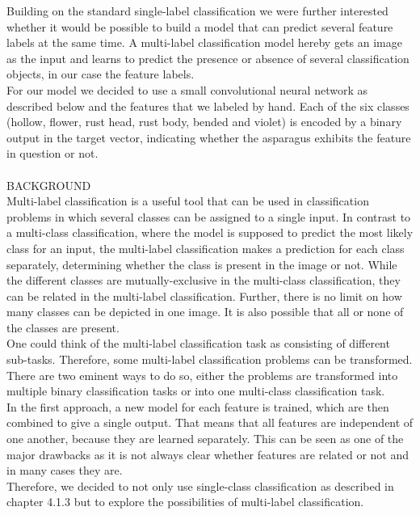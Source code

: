 Building on the standard single-label classification we were further interested whether it would be possible to build a model that can predict several feature labels at the same time. A multi-label classification model hereby gets an image as the input and learns to predict the presence or absence of several classification objects, in our case the feature labels. \\
For our model we decided to use a small convolutional neural network as described below and the features that we labeled by hand. Each of the six classes (hollow, flower, rust head, rust body, bended and violet) is encoded by a binary output in the target vector, indicating whether the asparagus exhibits the feature in question or not. \\
\\
BACKGROUND \\
Multi-label classification is a useful tool that can be used in classification problems in which several classes can be assigned to a single input. In contrast to a multi-class classification, where the model is supposed to predict the most likely class for an input, the multi-label classification makes a prediction for each class separately, determining whether the class is present in the image or not. While the different classes are mutually-exclusive in the multi-class classification, they can be related in the multi-label classification. Further, there is no limit on how many classes can be depicted in one image. It is also possible that all or none of the classes are present. \\
One could think of the multi-label classification task as consisting of different sub-tasks. Therefore, some multi-label classification problems can be transformed. There are two eminent ways to do so, either the problems  are transformed into multiple binary classification tasks or into one multi-class classification task. \\
In the first approach, a new model for each feature is trained, which are then combined to give a single output. That means that all features are independent of one another, because they are learned separately. This can be seen as one of the major drawbacks as it is not always clear whether features are related or not and in many cases they are. \\
Therefore, we decided to not only use single-class classification as described in chapter 4.1.3 but to explore the possibilities of multi-label classification. \\
\\
